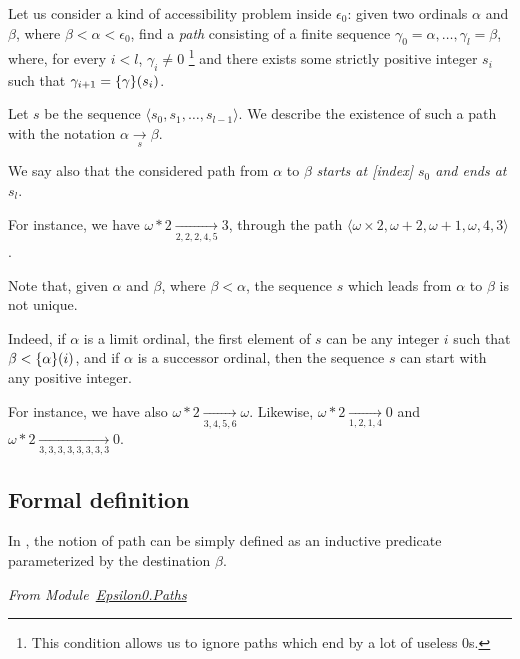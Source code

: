 Let us consider a kind of accessibility problem inside $\epsilon_0$: given two ordinals $\alpha$ and $\beta$, where $\beta<\alpha<\epsilon_0$, find a \emph{path} consisting of a finite sequence $\gamma_0=\alpha,\dots,\gamma_l=\beta$,
where, for every $i<l$, $\gamma_i \not= 0$ \footnote{This condition allows us to ignore paths which end by a lot of useless $0$s.} and there exists some strictly positive integer $s_i$
such that $\gamma_{i+1}=\mbox{$\{\gamma\}(s_i)$}$.

Let $s$ be the sequence $\langle s_0,s_1,\dots, s_{l-1} \rangle$. We describe the
existence of such a path with the notation $\alpha\xrightarrow [s]{}\beta$.

We say also that the considered path from $\alpha$ to $\beta$ \emph{starts at [index] $s_0$ and ends at $s_l$}.

For instance, we have $\omega*2 \xrightarrow[2,2,2,4,5]{}3$, through the 
path $\langle\omega\times 2, \omega+2,\omega+1,\omega,4,3\rangle$.


\begin{remark}
  

Note that, given $\alpha$ and $\beta$, where $\beta < \alpha$, the sequence $s$ which leads from $\alpha$ to $\beta$ is not unique.

Indeed, if $\alpha$ is a limit ordinal, the first element of $s$ can be any integer $i$ such that $\beta<\mbox{$\{\alpha\}(i)$}$, and if $\alpha$ is a successor ordinal,
then the sequence $s$ can start with any positive integer.


For instance, we have also 
$\omega*2 \xrightarrow[3,4,5,6]{}\omega$. 
Likewise,
$\omega*2 \xrightarrow[1,2,1,4]{} 0$ and
$\omega*2 \xrightarrow[3,3,3,3,3,3,3,3]{} 0$.
\end{remark}

\subsection{Formal definition}

\label{path-to-definition}

In \coq{}, the notion of path can be simply defined as an inductive predicate 
parameterized by the destination $\beta$.

\vspace{4pt}
\emph{From Module~\href{../theories/html/hydras.Epsilon0.Paths.html}{Epsilon0.Paths}}

\label{sect:path-to-def}

